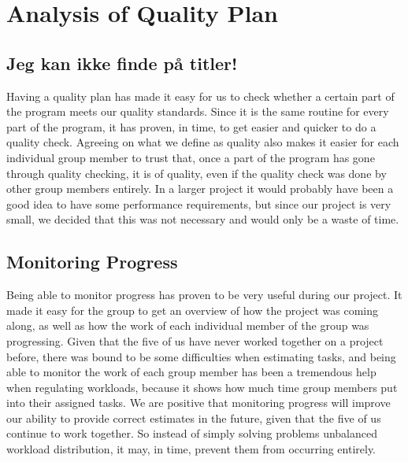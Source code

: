 \section{Analysis of Quality Plan}
\label{sec:AnalysisQualityControl}
\subsection{Jeg kan ikke finde på titler!}
Having a quality plan has made it easy for us to check whether a certain part of the program meets our quality standards. Since it is the same routine for every part of the program, it has proven, in time, to get easier and quicker to do a quality check. Agreeing on what we define as quality also makes it easier for each individual group member to trust that, once a part of the program has gone through quality checking, it is of quality, even if the quality check was done by other group members entirely. In a larger project it would probably have been a good idea to have some performance requirements, but since our project is very small, we decided that this was not necessary and would only be a waste of time.

\subsection{Monitoring Progress}
Being able to monitor progress has proven to be very useful during our project. It made it easy for the group to get an overview of how the project was coming along, as well as how the work of each individual member of the group was progressing. Given that the five of us have never worked together on a project before, there was bound to be some difficulties when estimating tasks, and being able to monitor the work of each group member has been a tremendous help when regulating workloads, because it shows how much time group members put into their assigned tasks.
We are positive that monitoring progress will improve our ability to provide correct estimates in the future, given that the five of us continue to work together. So instead of simply solving problems unbalanced workload distribution, it may, in time, prevent them from occurring entirely.